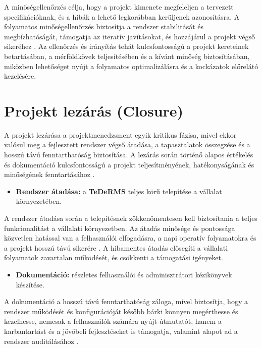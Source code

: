 A minőségellenőrzés célja, hogy a projekt kimenete megfeleljen a tervezett specifikációknak, és a hibák a lehető 
legkorábban kerüljenek azonosításra. A folyamatos minőségellenőrzés biztosítja a rendszer 
stabilitását és megbízhatóságát, támogatja az iteratív javításokat, és hozzájárul a projekt végső sikeréhez \cite{Kovacs2016,Kaposi2019,Szalay2018}.
Az ellenőrzés és irányítás tehát kulcsfontosságú a projekt kereteinek betartásában, a mérföldkövek teljesítésében és a 
kívánt minőség biztosításában, miközben lehetőséget nyújt a folyamatos optimalizálásra és a kockázatok előrelátó kezelésére.


\section{Projekt lezárás (Closure)}

A projekt lezárása a projektmenedzsment egyik kritikus fázisa, mivel ekkor valósul meg a fejlesztett 
rendszer végső átadása, a tapasztalatok összegzése és a hosszú távú fenntarthatóság biztosítása. 
A lezárás során történő alapos értékelés és dokumentáció 
kulcsfontosságú a projekt teljesítményének, hatékonyságának és minőségének fenntartásához \cite{Hajdu2014,Szalay2018,Kovacs2016,Kaposi2019}.

\begin{itemize}
    \item \textbf{Rendszer átadása:} a \textbf{TeDeRMS} teljes körű telepítése a vállalat környezetében.
\end{itemize}

A rendszer átadása során a telepítésnek zökkenőmentesen kell biztosítania a teljes funkcionalitást a 
vállalati környezetben. Az átadás minősége és pontossága közvetlen hatással 
van a felhasználói elfogadásra, a napi operatív folyamatokra és a projekt hosszú távú sikerére \cite{Szalay2018,Kovacs2016}. 
A hibamentes átadás elősegíti a vállalati folyamatok zavartalan működését, és csökkenti a támogatási igényeket.

\begin{itemize}
    \item \textbf{Dokumentáció:} részletes felhasználói és adminisztrátori kézikönyvek készítése.
\end{itemize}

A dokumentáció a hosszú távú fenntarthatóság záloga, mivel biztosítja, hogy a rendszer működését és 
konfigurációját később bárki könnyen megérthesse és kezelhesse, nemcsak a felhasználók számára nyújt útmutatót, hanem a 
karbantartást és a jövőbeli fejlesztéseket is támogatja, valamint alapot ad a rendszer auditálásához \cite{Hajdu2014,Kaposi2019}.

